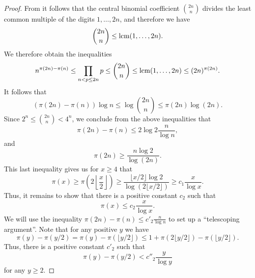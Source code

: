 \begin{proof}
  From  it follows that the central binomial coefficient $\binom{2n}{n}$ divides the least common multiple of the digits $1,\ldots,2n$, and therefore we have
  \begin{equation*}
    \binom{2n}{n}\leq \operatorname*{lcm}(1,\ldots,2n).
  \end{equation*}
  We therefore obtain the inequalities
  \begin{equation*}
    n^{\pi(2n)-\pi(n)} \leq \prod_{n<p\leq 2n}p\leq \binom{2n}{n} \leq \operatorname*{lcm}(1,\ldots,2n)\leq (2n)^{\pi(2n)}.
  \end{equation*}
  It follows that
  \begin{equation*}
    (\pi(2n)-\pi(n))\log n \leq \log\binom{2n}{n} \leq \pi(2n)\log(2n).
  \end{equation*}
  Since $2^n\leq \binom{2n}{n}<4^n$, we conclude from the above inequalities that
  \begin{equation*}
    \pi(2n)-\pi(n) \leq 2\log 2\frac{n}{\log n},
  \end{equation*}
  and
  \begin{equation*}
    \pi(2n)\geq \frac{n\log 2}{\log(2n)}.
  \end{equation*}
  This last inequality gives us for $x\geq 4$ that
  \begin{equation*}
    \pi(x)\geq \pi\left(2\left\lfloor\frac{x}{2}\right\rfloor\right) \geq \frac{\lfloor x/2\rfloor\log 2}{\log(2\lfloor x/2\rfloor)}\geq c_1\frac{x}{\log x}.
  \end{equation*}
  Thus, it remains to show that there is a positive constant $c_2$ such that
  \begin{equation*}
    \pi(x)\leq c_2\frac{x}{\log x}.
  \end{equation*}
  We will use the inequality $\pi(2n)-\pi(n)\leq c'_2\frac{n}{\log n}$ to set up a ``telescoping argument''. Note that for any positive $y$ we have
  \begin{equation*}
    \pi(y)-\pi(y/2)=\pi(y)-\pi(\lfloor y/2\rfloor) \leq 1+ \pi(2\lfloor y/2\rfloor)-\pi(\lfloor y/2\rfloor).
  \end{equation*}
  Thus, there is a positive constant $c'_2$ such that
  \begin{equation*}
    \pi(y)-\pi(y/2)<c''_2\frac{y}{\log y}
  \end{equation*}
  for any $y\geq 2$.


\end{proof}
